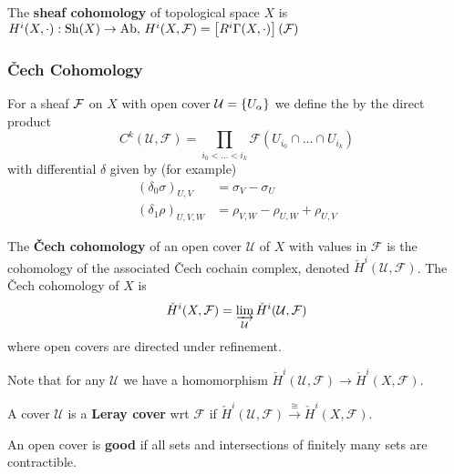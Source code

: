 \documentclass{article}
\begin{document}
\begin{definition}
	The \textbf{sheaf cohomology} of topological space $X$ is $H^i(X,\cdot) : \operatorname{Sh}(X) \to \text{Ab}, \, H^i(X,\mathcal{F}) = \left[ R^i\Gamma(X,\cdot) \right](\mathcal{F})$
\end{definition}

\subsubsection{\v{C}ech Cohomology}





\begin{definition}
	For a sheaf $\mathcal{F}$ on $X$ with open cover $\mathcal{U} = \left\{ U_\alpha \right\}$ we define the  by the direct product 
	\[
	C^k(\mathcal{U},\mathcal{F}) = \prod_{i_0 < \dots <i_k} \mathcal{F}(U_{i_0} \cap \dots \cap U_{i_k})
	\]
	with differential $\delta$ given by (for example) 
	\begin{align*}
	(\delta_0 \sigma)_{U,V} &= \sigma_V - \sigma_U \\
	(\delta_1 \rho)_{U,V,W} &= \rho_{V,W} - \rho_{U,W} + \rho_{U,V} 
	\end{align*}
\end{definition}

\begin{definition}
	The \textbf{\v{C}ech cohomology} of an open cover $\mathcal{U}$ of $X$ with values in $\mathcal{F}$ is the cohomology of the associated \v{C}ech cochain complex, denoted $\check{H}^i(\mathcal{U},\mathcal{F})$. The \v{C}ech cohomology of $X$ is 
	\[
	\check{H}^i(X,\mathcal{F}) = \varinjlim_{\mathcal{U}} \check{H}^i(\mathcal{U},\mathcal{F})
	\]
	where open covers are directed under refinement. 
\end{definition}

Note that for any $\mathcal{U}$ we have a homomorphism $\check{H}^i(\mathcal{U},\mathcal{F}) \to \check{H}^i(X,\mathcal{F})$. 
\begin{definition}
	A cover $\mathcal{U}$ is a \textbf{Leray cover} wrt $\mathcal{F}$ if $\check{H}^i(\mathcal{U},\mathcal{F}) \overset{\cong}{\to} \check{H}^i(X,\mathcal{F})$.
\end{definition}

\begin{definition}
	An open cover is \textbf{good} if all sets and intersections of finitely many sets are contractible. 
\end{definition}
\end{document}
